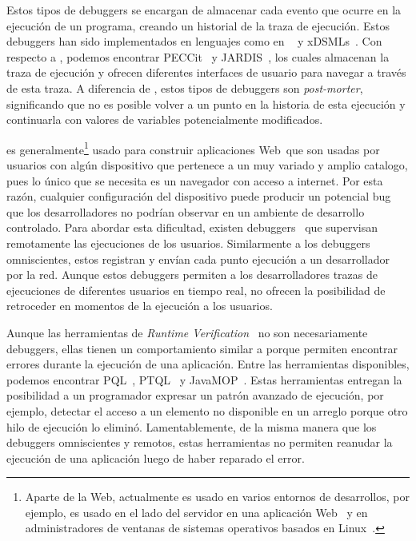 \documentclass[conference]{IEEEtran}
\begin{document}
\smallskip

 Estos tipos de debuggers se encargan de almacenar cada evento que ocurre en la ejecuci\'on de un programa, creando un historial de la traza de ejecuci\'on. Estos debuggers han sido implementados en lenguajes como en \java~\cite{tod:oopsla2007} y xDSMLs~\cite{bousseAl:SLE2015}. Con respecto a  \javascript, podemos encontrar PECCit~\cite{azar:2016} y JARDIS~\cite{barrAl:fse2016}, los cuales almacenan la traza de ejecuci\'on y ofrecen diferentes interfaces de usuario para navegar a trav\'es de esta traza. A diferencia de \deloreanjs, estos tipos de debuggers son {\em post-morter}, significando que no es posible volver a un punto en la historia de esta ejecuci\'on y continuarla con valores de variables potencialmente modificados. 

\smallskip

 \javascript es generalmente\footnote{Aparte de la Web, \javascript actualmente es usado en varios entornos de desarrollos, por ejemplo, es usado en el lado del servidor en una aplicaci\'on Web~\cite{nodejs:2018} y en administradores de ventanas de sistemas operativos basados en Linux~\cite{gjs}.} usado para construir aplicaciones Web\ que son usadas por usuarios con alg\'un dispositivo que pertenece a un muy variado y amplio catalogo, pues lo \'unico que se necesita es un navegador con acceso a internet. Por esta raz\'on, cualquier configuraci\'on del dispositivo puede producir un potencial bug que los desarrolladores no podr\'ian observar en un ambiente de desarrollo controlado. Para abordar esta dificultad, existen debuggers~\cite{sessionstack,raygun,trackjs} que supervisan remotamente las ejecuciones de los usuarios. Similarmente a los debuggers omniscientes, estos registran y env\'ian cada punto ejecuci\'on a un desarrollador por la red. Aunque estos debuggers permiten a los desarrolladores trazas de ejecuciones de diferentes usuarios en tiempo real, no ofrecen la posibilidad de retroceder en momentos de la ejecuci\'on a los usuarios.   

\smallskip

Aunque las herramientas de {\em Runtime Verification}~\cite{meredith:phd} no son necesariamente debuggers, ellas tienen un comportamiento similar a \deloreanjs porque permiten encontrar errores durante la ejecuci\'on de una aplicaci\'on. Entre las herramientas disponibles, podemos encontrar PQL~\cite{martinAl:oopsla2005}, PTQL~\cite{goldsmithAl:oopsla2005} y JavaMOP~\cite{meredithAl:jsttt2011,chen:oopsla2007}. Estas herramientas entregan la posibilidad a un programador expresar un patr\'on avanzado de ejecuci\'on, por ejemplo, detectar el acceso a un elemento no disponible en un arreglo porque otro hilo de ejecuci\'on lo elimin\'o. Lamentablemente, de la misma manera que los debuggers omniscientes y remotos, estas herramientas no permiten reanudar la ejecuci\'on de una aplicaci\'on luego de haber reparado el error.    
\end{document}
